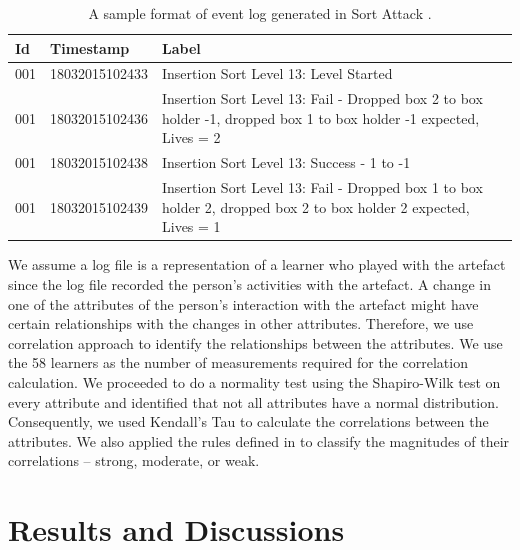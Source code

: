\documentclass[conference]{IEEEtran}
\begin{document}
\begin{table}[]
  \centering
  \caption{A sample format of event log generated in Sort Attack \cite{yohannis2015visualization}.}
  \label{tab:log}
  \begin{tabular}{p{.02\linewidth} p{.2\linewidth} p{.62\linewidth}}
    \hline
    \textbf{Id} & \textbf{Timestamp} & \textbf{Label}                                                                                                         \\ \hline
    001         & 18032015102433     & Insertion Sort Level 13: Level Started                                                                                 \\
    001         & 18032015102436     & Insertion   Sort Level 13: Fail - Dropped box 2 to box holder -1, dropped box 1 to box   holder -1 expected, Lives = 2 \\
    001         & 18032015102438     & Insertion   Sort Level 13: Success - 1 to -1                                                                           \\
    001         & 18032015102439     & Insertion Sort Level 13: Fail - Dropped box 1 to box holder 2, dropped box 2 to box holder 2 expected, Lives = 1       \\ \hline
  \end{tabular}
\end{table}

We assume a log file is a representation of a learner who played with the artefact since the log file recorded the person’s activities with the artefact. A change in one of the attributes of the person’s interaction with the artefact might have certain relationships with the changes in other attributes. Therefore, we use correlation approach to identify the relationships between the attributes.  We use the 58 learners as the number of measurements required for the correlation calculation. We proceeded to do a normality test using the Shapiro-Wilk test \cite{shapiro1965variance} on every attribute and identified that not all attributes have a normal distribution. Consequently, we used Kendall’s Tau \cite{kendall1938correlation} to calculate the correlations between the attributes. We also applied the rules defined in \cite{dancey2007statistics} to classify the magnitudes of their correlations -- strong, moderate, or weak.


\section{Results and Discussions}
\label{sec:results_and_discussions}
\end{document}
